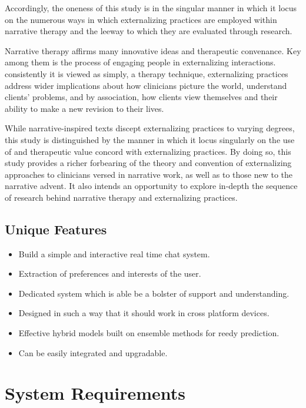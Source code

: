 Accordingly, the oneness of this study is in the singular manner in which it locus on the numerous ways in which externalizing practices are employed within narrative therapy and the leeway to which they are evaluated through research.

Narrative therapy affirms many innovative ideas and therapeutic convenance. Key among them is the process of engaging people in externalizing interactions. consistently it is viewed as simply, a therapy technique, externalizing practices address wider implications about how clinicians picture the world, understand clients’ problems, and by association, how clients view themselves and their ability to make a new revision to their lives.

While narrative-inspired texts discept externalizing practices to varying degrees, this study is distinguished by the manner in which it locus singularly on the use of and therapeutic value concord with externalizing practices. By doing so, this study provides a richer forbearing of the theory and convention of externalizing approaches to clinicians versed in narrative work, as well as to those new to the narrative advent. It also intends an opportunity to explore in-depth the sequence of research behind narrative therapy and externalizing practices.

\subsection{Unique Features}

\begin{itemize}
    \item Build a simple and interactive real time chat system.
    \item Extraction of preferences and interests of the user.
    \item Dedicated system which is able be a bolster of support and understanding.
    \item Designed in such a way that it should work in cross platform devices.
    \item Effective hybrid models built on ensemble methods for reedy prediction.
    \item Can be easily integrated and upgradable.
\end{itemize}

\pagebreak

\section{System Requirements}


